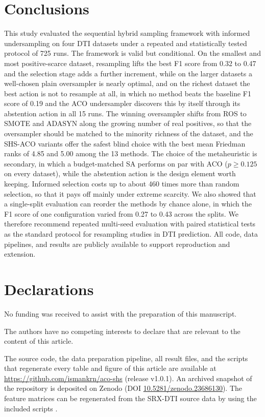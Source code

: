 \documentclass[pdflatex,sn-basic]{sn-jnl}
\begin{document}
\section{Conclusions}
This study evaluated the sequential hybrid sampling framework with
informed undersampling on four DTI datasets under a repeated and
statistically tested protocol of 725 runs. The framework is valid but
conditional. On the smallest and most positive-scarce dataset,
resampling lifts the best F1 score from 0.32 to 0.47 and the selection
stage adds a further increment, while on the larger datasets a
well-chosen plain oversampler is nearly optimal, and on the richest
dataset the best action is not to resample at all, in which no method
beats the baseline F1 score of 0.19 and the ACO undersampler discovers
this by itself through its abstention action in all 15 runs. The winning
oversampler shifts from ROS to SMOTE and ADASYN along the growing number
of real positives, so that the oversampler should be matched to the
minority richness of the dataset, and the SHS-ACO variants offer the
safest blind choice with the best mean Friedman ranks of 4.85 and 5.00
among the 13 methods. The choice of the metaheuristic is secondary, in
which a budget-matched SA performs on par with ACO ($p \geq 0.125$ on
every dataset), while the abstention action is the design element worth
keeping. Informed selection costs up to about 460 times more than random selection, so that it pays off mainly under extreme
scarcity. We also showed that a single-split evaluation can reorder the
methods by chance alone, in which the F1 score of one configuration
varied from 0.27 to 0.43 across the splits. We therefore recommend
repeated multi-seed evaluation with paired statistical tests as the
standard protocol for resampling studies in DTI prediction. All code,
data pipelines, and results are publicly available to support
reproduction and extension.

\section*{Declarations}

No funding was received to assist with the preparation of this
manuscript.

The authors have no competing interests to declare that are relevant to
the content of this article.

The source code, the data preparation pipeline, all result files, and
the scripts that regenerate every table and figure of this article are
available at \url{https://github.com/ismankrn/aco-shs} (release v1.0.1). An archived snapshot of the repository is deposited on Zenodo
(DOI \href{https://doi.org/10.5281/zenodo.23686130}%
{10.5281/zenodo.23686130}). The feature
matrices can be regenerated from the SRX-DTI source data by using the
included scripts \citep{khojasteh2023improving}.
\end{document}
